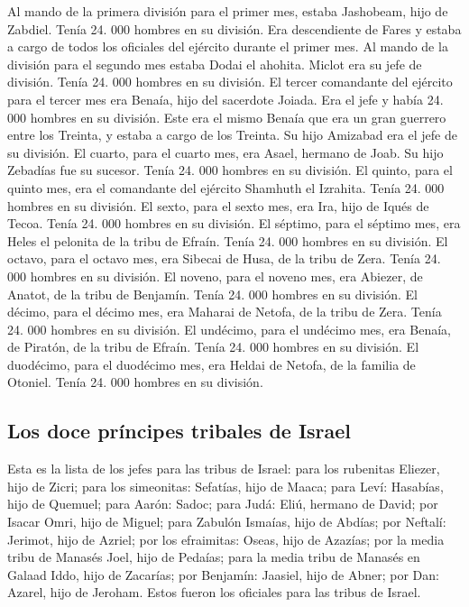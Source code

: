  Al mando de la primera división para el primer mes,
estaba Jashobeam, hijo de Zabdiel. Tenía 24. 000 hombres en su división.
 Era descendiente de Fares y estaba a cargo de todos los
oficiales del ejército durante el primer mes.  Al mando de
la división para el segundo mes estaba Dodai el ahohita. Miclot era su
jefe de división. Tenía 24. 000 hombres en su división. 
El tercer comandante del ejército para el tercer mes era Benaía, hijo
del sacerdote Joiada. Era el jefe y había 24. 000 hombres en su
división.  Este era el mismo Benaía que era un gran
guerrero entre los Treinta, y estaba a cargo de los Treinta. Su hijo
Amizabad era el jefe de su división.  El cuarto, para el
cuarto mes, era Asael, hermano de Joab. Su hijo Zebadías fue su sucesor.
Tenía 24. 000 hombres en su división.  El quinto, para el
quinto mes, era el comandante del ejército Shamhuth el Izrahita. Tenía
24. 000 hombres en su división.  El sexto, para el sexto
mes, era Ira, hijo de Iqués de Tecoa. Tenía 24. 000 hombres en su
división.  El séptimo, para el séptimo mes, era Heles el
pelonita de la tribu de Efraín. Tenía 24. 000 hombres en su división.
 El octavo, para el octavo mes, era Sibecai de Husa, de
la tribu de Zera. Tenía 24. 000 hombres en su división. 
El noveno, para el noveno mes, era Abiezer, de Anatot, de la tribu de
Benjamín. Tenía 24. 000 hombres en su división.  El
décimo, para el décimo mes, era Maharai de Netofa, de la tribu de Zera.
Tenía 24. 000 hombres en su división.  El undécimo, para
el undécimo mes, era Benaía, de Piratón, de la tribu de Efraín. Tenía
24. 000 hombres en su división.  El duodécimo, para el
duodécimo mes, era Heldai de Netofa, de la familia de Otoniel. Tenía 24.
000 hombres en su división.

\hypertarget{los-doce-pruxedncipes-tribales-de-israel}{%
\subsection{Los doce príncipes tribales de
Israel}\label{los-doce-pruxedncipes-tribales-de-israel}}

 Esta es la lista de los jefes para las tribus de Israel:
para los rubenitas Eliezer, hijo de Zicri; para los simeonitas:
Sefatías, hijo de Maaca;  para Leví: Hasabías, hijo de
Quemuel; para Aarón: Sadoc;  para Judá: Eliú, hermano de
David; por Isacar Omri, hijo de Miguel;  para Zabulón
Ismaías, hijo de Abdías; por Neftalí: Jerimot, hijo de Azriel;
 por los efraimitas: Oseas, hijo de Azazías; por la media
tribu de Manasés Joel, hijo de Pedaías;  para la media
tribu de Manasés en Galaad Iddo, hijo de Zacarías; por Benjamín:
Jaasiel, hijo de Abner;  por Dan: Azarel, hijo de
Jeroham. Estos fueron los oficiales para las tribus de Israel.

